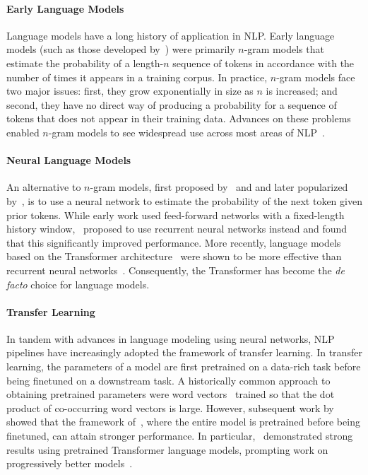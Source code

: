 \documentclass[twoside,11pt]{article}
\begin{document}
\paragraph{Early Language Models}
Language models have a long history of application in NLP.
Early language models (such as those developed by~\citealp{shannon1948mathematical}) were primarily $n$-gram models that estimate the probability of a length-$n$ sequence of tokens in accordance with the number of times it appears in a training corpus.
In practice, $n$-gram models face two major issues: first, they grow exponentially in size as $n$ is increased; and second, they have no direct way of producing a probability for a sequence of tokens that does not appear in their training data.
Advances on these problems enabled $n$-gram models to see widespread use across most areas of NLP~\citep{goodman2001bit}.

\paragraph{Neural Language Models}
An alternative to $n$-gram models, first proposed by~\citet{miikkulainen1991natural} and \citet{schmidhuber1996sequential} and later popularized by~\citet{bengio2000neural}, is to use a neural network to estimate the probability of the next token given prior tokens.
While early work used feed-forward networks with a fixed-length history window,~\citet{mikolov2010recurrent,sutskever2011generating,graves2013generating} proposed to use recurrent neural networks instead and found that this significantly improved performance.
More recently, language models based on the Transformer architecture~\citep{vaswani2017attention} were shown to be more effective than recurrent neural networks~\citep{radford2018improving,al2019character,kaplan2020scaling}.
Consequently, the Transformer has become the \textit{de facto} choice for language models.

\paragraph{Transfer Learning}
In tandem with advances in language modeling using neural networks, NLP pipelines have increasingly adopted the framework of transfer learning.
In transfer learning, the parameters of a model are first pretrained on a data-rich task before being finetuned on a downstream task.
A historically common approach to obtaining pretrained parameters were word vectors~\citep{mikolov2013distributed} trained so that the dot product of co-occurring word vectors is large.
However, subsequent work by~\citet{peters2018deep,howard2018universal,radford2018improving,devlin2019bert} showed that the framework of~\citet{collobert2011natural}, where the entire model is pretrained before being finetuned, can attain stronger performance.
In particular,~\citet{radford2018improving,devlin2019bert} demonstrated strong results using pretrained Transformer language models, prompting work on progressively better models~\citep[etc.]{liu2019roberta,yang2019xlnet,lewis2020bart,raffel2020exploring,zhang2019ernie}.
\end{document}
